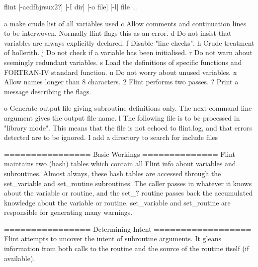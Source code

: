 {{\eightpoint\begintt
 flint [-acdfhjrsux2?] [-I dir] [-o file] [-l] file ...

  a    make crude list of all variables used
  c    Allow comments and continuation lines to be interwoven. 
       Normally flint flags this as an error.
  d    Do not insist that variables are always explicitly declared.
  f    Disable "line checks".
  h    Crude treatment of hollerith.
  j    Do not check if a variable has been initialised.
  r    Do not warn about seemingly redundant variables.
  s    Load the definitions of specific functions and FORTRAN-IV
       standard function.
  u    Do not worry about unused variables.
  x    Allow names longer than 8 characters.
  2    Flint performs two passes.
  ?    Print a message describing the flags.

  o    Generate output file giving subroutine definitions only. The 
       next command line argument gives the output file name.
  l    The following file is to be processed in "library mode". This
       means that the file is not echoed to flint.log, and that errors
       detected are to be ignored.
  I    add a directory to search for include files 

\endtt}
\newline\newline ================
\newline Basic Workings
\newline ==============
\newline Flint maintains two (hash) tables which contain all Flint info about
variables and subroutines. Almost always, these hash tables are 
accessed through the set\_variable and set\_routine subroutines. The 
caller passes in whatever it knows about the variable or routine, 
and the set\_? routine passes back the accumulated knowledge about 
the variable or routine. set\_variable and set\_routine are responsible 
for generating many warnings. 

\newline\newline ================
\newline Determining Intent
\newline\newline ==================
\newline Flint attempts to uncover the intent of subroutine arguments. It 
gleans information from both calls to the routine and the source of 
the routine itself (if available).

}
